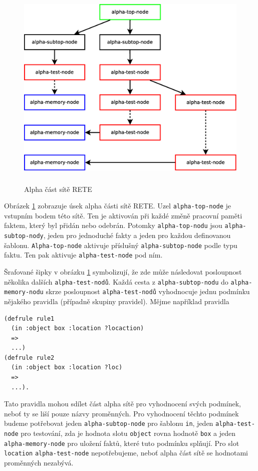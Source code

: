 \begin{figure}[h]
\centering
\includegraphics[height=10cm]{rete-alpha.eps}
\caption{Alpha část sítě RETE}
\label{rete-alpha}
\end{figure}

Obrázek \ref{rete-alpha} zobrazuje úsek alpha části sítě RETE. Uzel
\verb|alpha-top-node| je vstupním bodem této sítě. Ten je aktivován při každé
změně pracovní paměti faktem, který byl přidán nebo odebrán. Potomky
\verb|alpha-top-nodu| jsou \verb|alpha-subtop-nody|, jeden pro jednoduché fakty
a jeden pro každou definovanou šablonu. \verb|Alpha-top-node| aktivuje příslušný
\verb|alpha-subtop-node| podle typu faktu. Ten pak aktivuje
\verb|alpha-test-node| pod ním.

Šrafované šipky v obrázku \ref{rete-alpha} symbolizují, že zde může následovat
posloupnost několika dalších \verb|alpha-test-nodů|. Každá cesta z
\verb|alpha-subtop-nodu| do \verb|alpha-memory-nodu| skrze posloupnost
\verb|alpha-test-nodů| vyhodnocuje jednu podmínku nějakého pravidla (případně
skupiny pravidel). Mějme například pravidla
\begin{verbatim}
(defrule rule1
  (in :object box :location ?locaction)
  =>
  ...)
(defrule rule2
  (in :object box :location ?loc)
  =>
  ...).
\end{verbatim}
Tato pravidla mohou sdílet část alpha sítě pro vyhodnocení svých podmínek, neboť
ty se liší pouze názvy proměnných. Pro vyhodnocení těchto podmínek budeme
potřebovat jeden \verb|alpha-subtop-node| pro šablonu \verb|in|, jeden
\verb|alpha-test-node| pro testování, zda je hodnota slotu \verb|object| rovna
hodnotě \verb|box| a jeden \verb|alpha-memory-node| pro uložení faktů, které
tuto podmínku splňují. Pro slot \verb|location| \verb|alpha-test-node|
nepotřebujeme, neboť alpha část sítě se hodnotami proměnných nezabývá.

